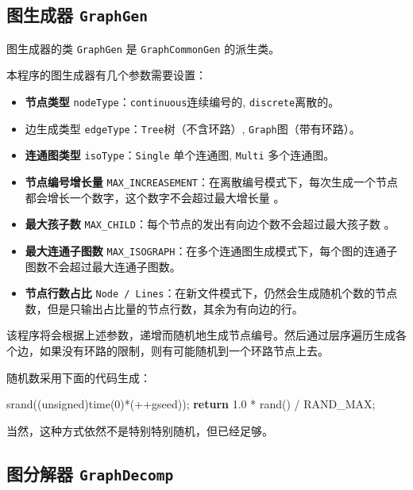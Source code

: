\documentclass[
]{article}
\newenvironment{Shaded}{}{}
\newcommand{\ControlFlowTok}[1]{\textcolor[rgb]{0.00,0.44,0.13}{\textbf{#1}}}
\newcommand{\DataTypeTok}[1]{\textcolor[rgb]{0.56,0.13,0.00}{#1}}
\newcommand{\DecValTok}[1]{\textcolor[rgb]{0.25,0.63,0.44}{#1}}
\newcommand{\FloatTok}[1]{\textcolor[rgb]{0.25,0.63,0.44}{#1}}
\newcommand{\NormalTok}[1]{#1}
\begin{document}
\hypertarget{header-n109}{%
\subsection{\texorpdfstring{图生成器
\texttt{GraphGen}}{图生成器 GraphGen}}\label{header-n109}}

图生成器的类 \texttt{GraphGen} 是 \texttt{GraphCommonGen} 的派生类。

本程序的图生成器有几个参数需要设置：

\begin{itemize}
\item
  \textbf{节点类型} \texttt{nodeType}：\texttt{continuous}连续编号的,
  \texttt{discrete}离散的。
\item
  边生成类型 \texttt{edgeType}：\texttt{Tree}树（不含环路）,
  \texttt{Graph}图（带有环路）。
\item
  \textbf{连通图类型} \texttt{isoType}：\texttt{Single} 单个连通图,
  \texttt{Multi} 多个连通图。
\item
  \textbf{节点编号增长量}
  \texttt{MAX\_INCREASEMENT}：在离散编号模式下，每次生成一个节点都会增长一个数字，这个数字不会超过最大增长量
  。
\item
  \textbf{最大孩子数}
  \texttt{MAX\_CHILD}：每个节点的发出有向边个数不会超过最大孩子数 。
\item
  \textbf{最大连通子图数}
  \texttt{MAX\_ISOGRAPH}：在多个连通图生成模式下，每个图的连通子图数不会超过最大连通子图数。
\item
  \textbf{节点行数占比}
  \texttt{Node\ /\ Lines}：在新文件模式下，仍然会生成随机个数的节点数，但是只输出占比量的节点行数，其余为有向边的行。
\end{itemize}

该程序将会根据上述参数，递增而随机地生成节点编号。然后通过层序遍历生成各个边，如果没有环路的限制，则有可能随机到一个环路节点上去。

随机数采用下面的代码生成：

\begin{Shaded}
\begin{Highlighting}[]
\NormalTok{srand((}\DataTypeTok{unsigned}\NormalTok{)time(}\DecValTok{0}\NormalTok{)*(++gseed));}
\ControlFlowTok{return} \FloatTok{1.0}\NormalTok{ * rand() / RAND\_MAX;	}
\end{Highlighting}
\end{Shaded}

当然，这种方式依然不是特别特别随机，但已经足够。

\hypertarget{header-n131}{%
\subsection{\texorpdfstring{图分解器
\texttt{GraphDecomp}}{图分解器 GraphDecomp}}\label{header-n131}}
\end{document}
